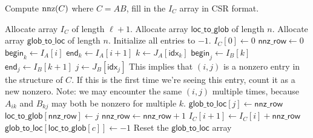 \documentclass{lecture}
\begin{document}
\begin{algorithm}[H]
   \caption{Compute $\operatorname{nnz}(C)$ where $C = AB$, fill in the $I_C$ array in CSR format.}
   \begin{algorithmic}
      \State Allocate array $I_C$ of length $\ell + 1$.
      \State Allocate array $\textsf{loc\_to\_glob}$ of length $n$.
      \State Allocate array $\textsf{glob\_to\_loc}$ of length $n$. Initialize all entries to $-1$.
      \State $I_C[0] \gets 0$
         \State $\textsf{nnz\_row} \gets 0$
         \State $\textsf{begin}_k \gets I_A[i]$
         \State $\textsf{end}_k \gets I_A[i+1]$
            \State $k \gets J_A[\textsf{idx}_k]$ 
%
            \State $\textsf{begin}_j \gets I_B[k]$
            \State $\textsf{end}_j \gets I_B[k+1]$
%
               \State $j \gets J_B[\textsf{idx}_j]$
               \State This implies that $(i,j)$ is a nonzero entry in the structure of $C$. If this is the first time we're seeing this entry, count it as a new nonzero. Note: we may encounter the same $(i,j)$ multiple times, because $A_{ik}$ and $B_{kj}$ may both be nonzero for multiple $k$.
                  \State $\textsf{glob\_to\_loc}[j] \gets \textsf{nnz\_row}$
                  \State $\textsf{loc\_to\_glob}[\textsf{nnz\_row}] \gets j$
                  \State $\textsf{nnz\_row} \gets \textsf{nnz\_row} + 1$
               \EndIf
            \EndFor
         \EndFor
         \State $I_C[i+1] \gets I_C[i] + \textsf{nnz\_row}$
            \State $\textsf{glob\_to\_loc}[\textsf{loc\_to\_glob}[c]] \gets -1$
            \Comment Reset the $\textsf{glob\_to\_loc}$ array
         \EndFor
      \EndFor
   \end{algorithmic}
\end{algorithm}
\end{document}
